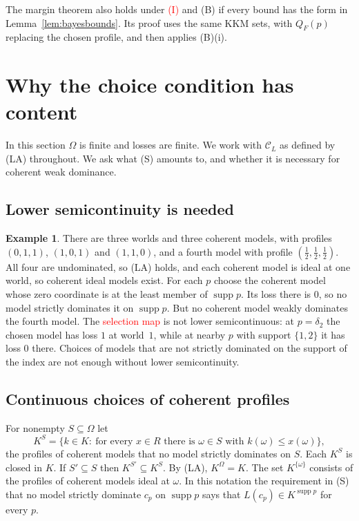\documentclass[11pt]{article}
\theoremstyle{definition}
\newtheorem{example}[theorem]{Example}
\theoremstyle{remark}
\newcommand{\C}{\mathcal C}
\newcommand{\supp}{\operatorname{supp}}
\begin{document}
The margin theorem also holds under \textcolor{red}{(I)} and (B) if every bound has the form in Lemma~\ref{lem:bayesbounds}. Its proof uses the same KKM sets, with $Q_F(p)$ replacing the chosen profile, and then applies (B)(i).
\section{Why the choice condition has content}\label{sec:finite}
In this section $\Omega$ is finite and losses are finite. We work with $\C_L$ as defined by (LA) throughout. We ask what (S) amounts to, and whether it is necessary for coherent weak dominance.

\subsection{Lower semicontinuity is needed}
\begin{example}\label{ex:continuity-needed}
There are three worlds and three coherent models, with profiles $(0,1,1)$, $(1,0,1)$ and $(1,1,0)$, and a fourth model with profile $(\tfrac12,\tfrac12,\tfrac12)$. All four are undominated, so (LA) holds, and each coherent model is ideal at one world, so coherent ideal models exist. For each $p$ choose the coherent model whose zero coordinate is at the least member of $\supp p$. Its loss there is $0$, so no model strictly dominates it on $\supp p$. But no coherent model weakly dominates the fourth model. The \textcolor{red}{selection map} is not lower semicontinuous: at $p=\delta_2$ the chosen model has loss $1$ at world~$1$, while at nearby $p$ with support $\{1,2\}$ it has loss $0$ there. Choices of models that are not strictly dominated on the support of the index are not enough without lower semicontinuity.
\end{example}

\subsection{Continuous choices of coherent profiles}\label{sec:connect}
For nonempty $S\subseteq\Omega$ let
\[
 K^S=\{k\in K:\ \text{for every }x\in R\text{ there is }\omega\in S\text{ with }k(\omega)\le x(\omega)\},
\]
the profiles of coherent models that no model strictly dominates on $S$. Each $K^S$ is closed in $K$. If $S'\subseteq S$ then $K^{S'}\subseteq K^S$. By (LA), $K^\Omega=K$. The set $K^{\{\omega\}}$ consists of the profiles of coherent models ideal at $\omega$. In this notation the requirement in (S) that no model strictly dominate $c_p$ on $\supp p$ says that $L(c_p)\in K^{\supp p}$ for every $p$.
\end{document}
